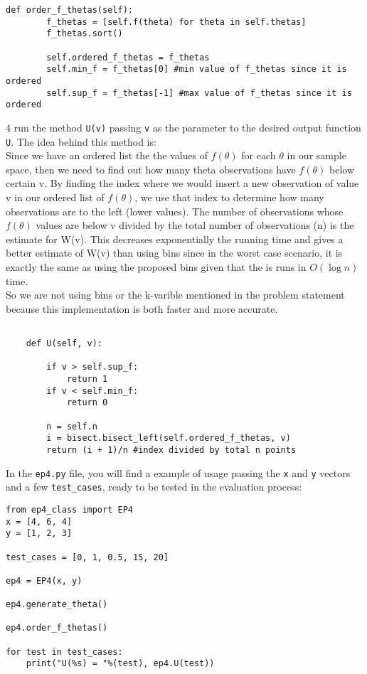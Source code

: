 \documentclass[12pt]{article}
\begin{document}
\begin{lstlisting}
def order_f_thetas(self):
		f_thetas = [self.f(theta) for theta in self.thetas]
		f_thetas.sort()

		self.ordered_f_thetas = f_thetas
		self.min_f = f_thetas[0] #min value of f_thetas since it is ordered
		self.sup_f = f_thetas[-1] #max value of f_thetas since it is ordered

\end{lstlisting}
4 run the method \texttt{U(v)} passing \texttt{v} as the parameter to the desired output function \texttt{U}. The idea behind this method is:\\
Since we have an ordered list the the values of $f(\theta)$ for each $\theta$ in our sample space, then we need to find out how many theta observations have $f(\theta)$ below certain v. By finding the index where we would insert a new observation of value v in our  ordered list of $f(\theta)$, we use that index to determine how many observations are to the left (lower values). The number of observations whose $f(\theta)$ values are below v divided by the  total number of observations (n) is the estimate for W(v). This decreases exponentially the running time and gives a better estimate of W(v) than using bins since in the worst case scenario, it is exactly the same as using the proposed bins given that the is runs in $O(\log n)$ time. \\
So we are not using bins or the k-varible mentioned in the problem statement because this implementation is both faster and more accurate.
\begin{lstlisting}

	def U(self, v):

		if v > self.sup_f:
			return 1
		if v < self.min_f:
			return 0

		n = self.n
		i = bisect.bisect_left(self.ordered_f_thetas, v)
		return (i + 1)/n #index divided by total n points
\end{lstlisting}
In the \texttt{ep4.py} file, you will find a example of usage passing the \texttt{x} and \texttt{y} vectors and a few \texttt{test\_cases}, ready to be tested in the evaluation process:
\begin{lstlisting}
from ep4_class import EP4
x = [4, 6, 4]
y = [1, 2, 3]

test_cases = [0, 1, 0.5, 15, 20]

ep4 = EP4(x, y)

ep4.generate_theta()

ep4.order_f_thetas()

for test in test_cases:
	print("U(%s) = "%(test), ep4.U(test))
\end{lstlisting}
\end{document}
